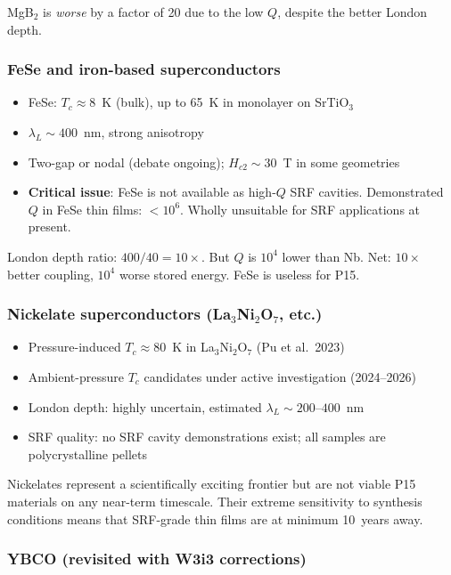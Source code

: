 \documentclass[11pt]{article}
\begin{document}
MgB$_2$ is \emph{worse} by a factor of 20 due to the low $Q$, despite the better London depth.

\subsubsection{FeSe and iron-based superconductors}

\begin{itemize}
\item FeSe: $T_c \approx 8$~K (bulk), up to 65~K in monolayer on SrTiO$_3$
\item $\lambda_L \sim 400$~nm, strong anisotropy
\item Two-gap or nodal (debate ongoing); $H_{c2} \sim 30$~T in some geometries
\item \textbf{Critical issue}: FeSe is not available as high-$Q$ SRF cavities.
Demonstrated $Q$ in FeSe thin films: $< 10^6$. Wholly unsuitable for SRF
applications at present.
\end{itemize}

London depth ratio: $400/40 = 10\times$. But $Q$ is $10^4$ lower than Nb.
Net: $10\times$ better coupling, $10^4$ worse stored energy. FeSe is useless for P15.

\subsubsection{Nickelate superconductors (La$_3$Ni$_2$O$_7$, etc.)}

\begin{itemize}
\item Pressure-induced $T_c \approx 80$~K in La$_3$Ni$_2$O$_7$ (Pu et al.\ 2023)
\item Ambient-pressure $T_c$ candidates under active investigation (2024--2026)
\item London depth: highly uncertain, estimated $\lambda_L \sim 200$--$400$~nm
\item SRF quality: no SRF cavity demonstrations exist; all samples are polycrystalline
pellets
\end{itemize}

Nickelates represent a scientifically exciting frontier but are not viable
P15 materials on any near-term timescale. Their extreme sensitivity to
synthesis conditions means that SRF-grade thin films are at minimum 10~years
away.

\subsubsection{YBCO (revisited with W3i3 corrections)}
\end{document}
